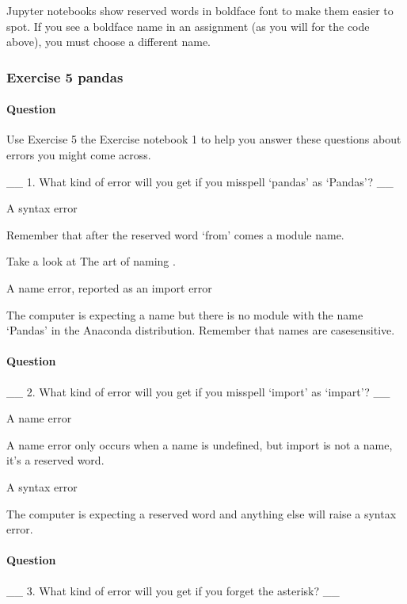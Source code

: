 \documentclass[letterpaper,10pt,english]{sphinxmanual}
\begin{document}
Jupyter notebooks show reserved words in boldface font to make them easier to spot. If you see a boldface name in an assignment (as you will for the code above), you must choose a different name.


\subsubsection{Exercise 5 pandas}
\label{\detokenize{content/session_02/Part_02_01:Exercise-5-pandas}}

\paragraph{Question}
\label{\detokenize{content/session_02/Part_02_01:Question}}
Use Exercise 5 the Exercise notebook 1 to help you answer these questions about errors you might come across.

\_\_ 1. What kind of error will you get if you misspell ‘pandas’ as ‘Pandas’? \_\_

A syntax error

Remember that after the reserved word ‘from’ comes a module name.

Take a look at The art of naming .

A name error, reported as an import error

The computer is expecting a name but there is no module with the name ‘Pandas’ in the Anaconda distribution. Remember that names are case\sphinxhyphen{}sensitive.


\paragraph{Question}
\label{\detokenize{content/session_02/Part_02_01:id1}}
\_\_ 2. What kind of error will you get if you misspell ‘import’ as ‘impart’? \_\_

A name error

A name error only occurs when a name is undefined, but import is not a name, it’s a reserved word.

A syntax error

The computer is expecting a reserved word and anything else will raise a syntax error.


\paragraph{Question}
\label{\detokenize{content/session_02/Part_02_01:id2}}
\_\_ 3. What kind of error will you get if you forget the asterisk? \_\_
\end{document}
